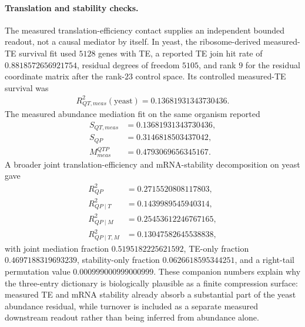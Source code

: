 \paragraph{Translation and stability checks.}
The measured translation-efficiency contact supplies an independent bounded readout, not a causal mediator by itself.  In yeast, the ribosome-derived measured-TE survival fit used $5128$ genes with TE, a reported TE join hit rate of $0.8818572656921754$, residual degrees of freedom $5105$, and rank $9$ for the residual coordinate matrix after the rank-$23$ control space.  Its controlled measured-TE survival was
$$
\begin{aligned}
R^2_{QT,meas}(\mathrm{yeast})=0.13681931343730436.
\end{aligned}
$$
The measured abundance mediation fit on the same organism reported
$$
\begin{aligned}
S_{QT,meas}&=0.13681931343730436,\\
S_{QP}&=0.3146818503437042,\\
M^{QTP}_{meas}&=0.4793069656345167.
\end{aligned}
$$
A broader joint translation-efficiency and mRNA-stability decomposition on yeast gave
$$
\begin{aligned}
R^2_{QP}&=0.2715520808117803,\\
R^2_{QP\mid T}&=0.1439989545940314,\\
R^2_{QP\mid M}&=0.25453612246767165,\\
R^2_{QP\mid T,M}&=0.13047582645538838,
\end{aligned}
$$
with joint mediation fraction $0.5195182225621592$, TE-only fraction $0.4697188319693239$, stability-only fraction $0.0626618595344251$, and a right-tail permutation value $0.000999000999000999$.  These companion numbers explain why the three-entry dictionary is biologically plausible as a finite compression surface: measured TE and mRNA stability already absorb a substantial part of the yeast abundance residual, while turnover is included as a separate measured downstream readout rather than being inferred from abundance alone.


